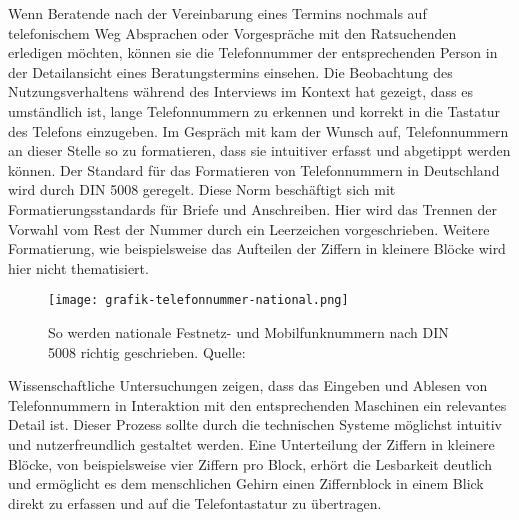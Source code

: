 Wenn Beratende nach der Vereinbarung eines Termins nochmals auf telefonischem
Weg Absprachen oder Vorgespräche mit den Ratsuchenden erledigen möchten, können
sie die Telefonnummer der entsprechenden Person in der Detailansicht eines
Beratungstermins einsehen. Die Beobachtung des Nutzungsverhaltens während des
Interviews im Kontext hat gezeigt, dass es umständlich ist, lange
Telefonnummern zu erkennen und korrekt in die Tastatur des Telefons einzugeben.
Im Gespräch mit \ipName kam der Wunsch auf, Telefonnummern an dieser Stelle so
zu formatieren, dass sie intuitiver erfasst und abgetippt werden können. Der
Standard für das Formatieren von Telefonnummern in Deutschland wird durch DIN
5008 geregelt. Diese Norm beschäftigt sich mit Formatierungsstandards für
Briefe und Anschreiben. Hier wird das Trennen der Vorwahl vom Rest der Nummer
durch ein Leerzeichen vorgeschrieben. Weitere Formatierung, wie beispielsweise
das Aufteilen der Ziffern in kleinere Blöcke wird hier nicht
thematisiert\cite{din5008}.

\begin{figure}[H]
    \caption{So werden nationale Festnetz- und Mobilfunknummern nach DIN 5008 richtig geschrieben. Quelle: \cite{phoneFormatBlog}}
    \centering
    \texttt{[image: grafik-telefonnummer-national.png]}
\end{figure}

Wissenschaftliche Untersuchungen zeigen, dass das Eingeben und Ablesen von
Telefonnummern in Interaktion mit den entsprechenden Maschinen ein relevantes
Detail ist. Dieser Prozess sollte durch die technischen Systeme möglichst
intuitiv und nutzerfreundlich gestaltet werden\cite{humCompPhoneNumbers}. Eine
Unterteilung der Ziffern in kleinere Blöcke, von beispielsweise vier Ziffern
pro Block, erhört die Lesbarkeit deutlich und ermöglicht es dem menschlichen
Gehirn einen Ziffernblock in einem Blick direkt zu erfassen und auf die
Telefontastatur zu
übertragen\cite{phoneFormatBlog}\cite{numberRecognition}\cite{numberRepres}.
